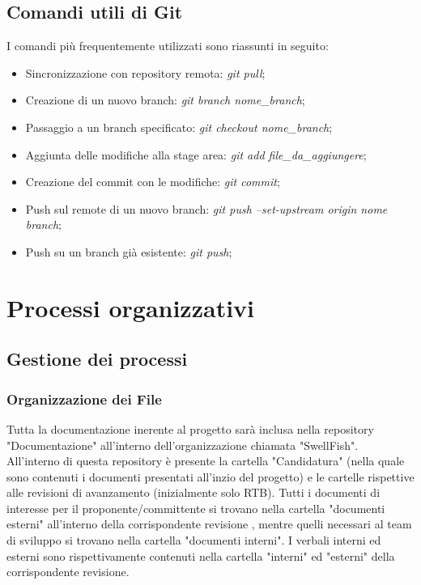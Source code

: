 \documentclass[12pt]{article}
\begin{document}
\subsection{Comandi utili di Git}
I comandi più frequentemente utilizzati sono riassunti in seguito:
\begin{itemize}
    \item Sincronizzazione con repository remota: \textit{git pull};
    \item Creazione di un nuovo branch: \textit{git branch nome\_branch};
    \item Passaggio a un branch specificato: \textit{git checkout nome\_branch};
    \item Aggiunta delle modifiche alla stage area: \textit{git add file\_da\_aggiungere};
    \item Creazione del commit con le modifiche: \textit{git commit};
    \item Push sul remote di un nuovo branch: \textit{git push --set-upstream origin nome branch};
    \item Push su un branch già esistente: \textit{git push};
\end{itemize}

\section{Processi organizzativi}
\subsection{Gestione dei processi}
\subsubsection{Organizzazione dei File}
Tutta la documentazione inerente al progetto sarà inclusa nella repository "Documentazione" all'interno dell'organizzazione chiamata "SwellFish".\\
All'interno di questa repository è presente la cartella "Candidatura" (nella quale sono contenuti i documenti presentati all'inzio del progetto) e le cartelle rispettive alle revisioni di avanzamento (inizialmente solo RTB). 
Tutti i documenti di interesse per il proponente/committente si trovano nella cartella "documenti esterni" all'interno della corrispondente revisione , mentre quelli necessari al team di sviluppo si trovano nella cartella "documenti interni".
I verbali interni ed esterni sono rispettivamente contenuti nella cartella "interni" ed "esterni" della corrispondente revisione.
\end{document}
